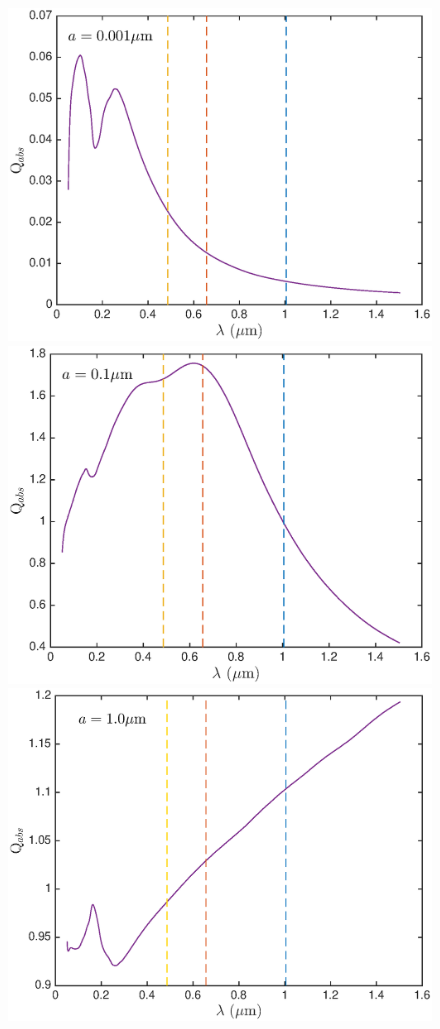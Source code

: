 \documentclass[useAMS,usenatbib,usegraphicx]{mnras}
\begin{document}
\begin{figure}
\includegraphics[trim =30 10 45 15,clip=true,scale=0.35]{Qabs_a0_001}
\includegraphics[trim =51 10 45 15,clip=true,scale=0.35]{Qabs_a0_1}
\includegraphics[trim =48 10 45 15,clip=true,scale=0.35]{Qabs_a1_0}

\end{figure}
\end{document}
